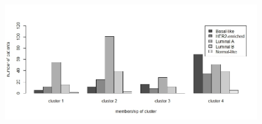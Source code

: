 \documentclass[conference]{IEEEtran}
\begin{document}
\begin{figure}
\centering
\includegraphics[scale=0.33]{images/Plot_subtypes_per_cluster_4Groups.jpeg}
\captionsetup{font=small}
\label{fig:plot_subtypes_cluster}
\end{figure}
\end{document}
